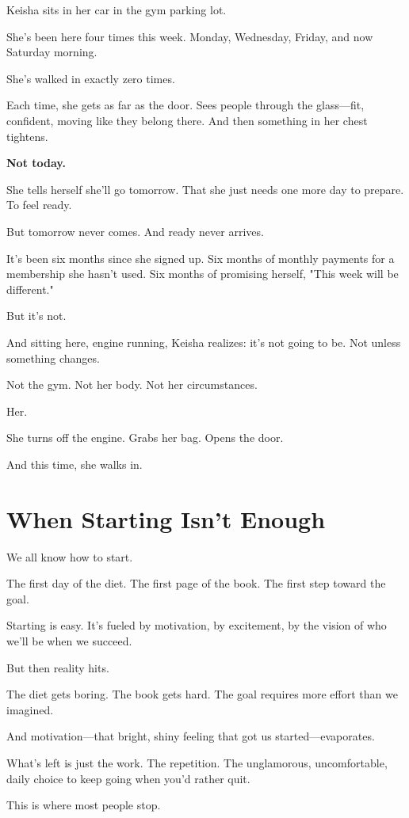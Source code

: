 \documentclass[11pt,twoside]{book}
\begin{document}
Keisha sits in her car in the gym parking lot.

She's been here four times this week. Monday, Wednesday, Friday, and now Saturday morning.

She's walked in exactly zero times.

Each time, she gets as far as the door. Sees people through the glass—fit, confident, moving like they belong there. And then something in her chest tightens.

\textbf{Not today.}

She tells herself she'll go tomorrow. That she just needs one more day to prepare. To feel ready.

But tomorrow never comes. And ready never arrives.

It's been six months since she signed up. Six months of monthly payments for a membership she hasn't used. Six months of promising herself, "This week will be different."

But it's not.

And sitting here, engine running, Keisha realizes: it's not going to be. Not unless something changes.

Not the gym. Not her body. Not her circumstances.

Her.

She turns off the engine. Grabs her bag. Opens the door.

And this time, she walks in.

\section*{When Starting Isn't Enough}

We all know how to start.

The first day of the diet. The first page of the book. The first step toward the goal.

Starting is easy. It's fueled by motivation, by excitement, by the vision of who we'll be when we succeed.

But then reality hits.

The diet gets boring. The book gets hard. The goal requires more effort than we imagined.

And motivation—that bright, shiny feeling that got us started—evaporates.

What's left is just the work. The repetition. The unglamorous, uncomfortable, daily choice to keep going when you'd rather quit.

This is where most people stop.
\end{document}
